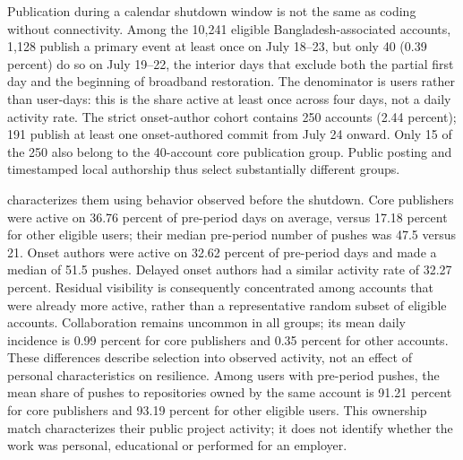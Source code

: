 Publication during a calendar shutdown window is not the same as coding without connectivity. Among the 10,241 eligible Bangladesh-associated accounts, 1,128 publish a primary event at least once on July 18--23, but only 40 (0.39 percent) do so on July 19--22, the interior days that exclude both the partial first day and the beginning of broadband restoration. The denominator is users rather than user-days: this is the share active at least once across four days, not a daily activity rate. The strict onset-author cohort contains 250 accounts (2.44 percent); 191 publish at least one onset-authored commit from July 24 onward. Only 15 of the 250 also belong to the 40-account core publication group. Public posting and timestamped local authorship thus select substantially different groups.

 characterizes them using behavior observed before the shutdown. Core publishers were active on 36.76 percent of pre-period days on average, versus 17.18 percent for other eligible users; their median pre-period number of pushes was 47.5 versus 21. Onset authors were active on 32.62 percent of pre-period days and made a median of 51.5 pushes. Delayed onset authors had a similar activity rate of 32.27 percent. Residual visibility is consequently concentrated among accounts that were already more active, rather than a representative random subset of eligible accounts. Collaboration remains uncommon in all groups; its mean daily incidence is 0.99 percent for core publishers and 0.35 percent for other accounts. These differences describe selection into observed activity, not an effect of personal characteristics on resilience. Among users with pre-period pushes, the mean share of pushes to repositories owned by the same account is 91.21 percent for core publishers and 93.19 percent for other eligible users. This ownership match characterizes their public project activity; it does not identify whether the work was personal, educational or performed for an employer.


